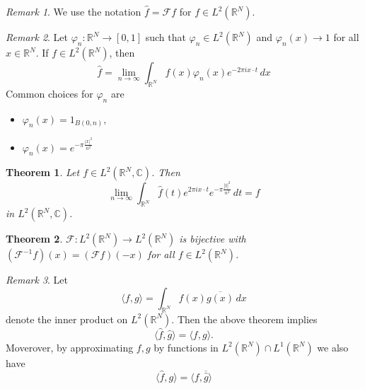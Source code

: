 \documentclass[10pt, oneside, reqno]{amsart}
\theoremstyle{plain}%
\newtheorem{thm}{Theorem}[section]
\theoremstyle{definition}
\theoremstyle{remark}
\newtheorem*{rem}{Remark}
\newcommand{\R}{\mathbb{R}}
\newcommand{\C}{\mathbb{C}}
\renewcommand{\phi}{\varphi}
\begin{document}
\begin{rem}
	We use the notation $\hat f = \mathcal{F} f$ for $f \in L^2(\R^N)$.  
\end{rem}
\begin{rem}
	Let $\phi_n : \R^N \rightarrow [0,1]$ such that $\phi_n \in L^2(\R^N)$ and $\phi_n(x) \rightarrow 1$ for all $x \in \R^N$. If $f \in L^2(\R^N)$, then \[
		\hat f = \lim_{n \rightarrow \infty} \int_{\R^N} f(x) \phi_n(x) e^{-2 \pi i x \cdot t} \, dx
	\]
	Common choices for $\phi_n$ are 
	\begin{itemize}
		\item $\phi_n(x) = 1_{B(0,n)},$
		\item $\phi_n(x) = e^{- \pi \frac{|x|^2}{n^2}}$
	\end{itemize}
\end{rem}

\begin{thm}
	Let $f \in L^2(\R^N, \C)$.  Then \[
		\lim_{n \rightarrow \infty} \int_{\R^N} \hat f (t) e^{2 \pi i x \cdot t} e^{- \pi \frac{|t|^2}{n^2}} \, dt = f
	\] in $L^2(\R^N, \C)$.
\end{thm}

\begin{thm}
	$\mathcal{F} : L^2(\R^N) \rightarrow L^2(\R^N)$ is bijective with $(\mathcal{F}^{-1} f) (x) = (\mathcal{F} f) (-x)$ for all $f \in L^2(\R^N)
$.
\end{thm}


\begin{rem}
	Let \[
		\langle f, g \rangle = \int_{\R^N} f(x) \overline{g(x)} \, dx
	\] denote the inner product on $L^2(\R^N)$.  Then the above theorem implies \[
		\langle \hat f, \hat g \rangle = \langle f, g \rangle.
	\]
	Moverover, by approximating $f,g$ by functions in $L^2(\R^N) \cap L^1(\R^N)$ we also have \[
		\langle \hat f, g \rangle = \langle f, \overline{\hat g} \rangle
	\]
\end{rem}


















\end{document}
